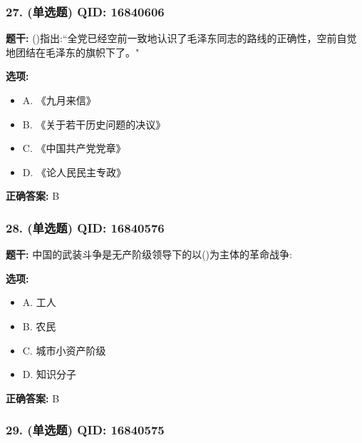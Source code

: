 \documentclass[12pt,UTF8]{ctexart}
\begin{document}
\subsubsection*{27. (单选题) \small QID: 16840606}

\textbf{题干:}
()指出:“全党已经空前一致地认识了毛泽东同志的路线的正确性，空前自觉地团结在毛泽东的旗帜下了。"

\textbf{选项:}
\begin{itemize}[leftmargin=*]

  \item A. 《九月来信》

  \item B. 《关于若干历史问题的决议》

  \item C. 《中国共产党党章》

  \item D. 《论人民民主专政》

\end{itemize}

\textbf{正确答案:}
B

\vspace{0.3em}\hrulefill\vspace{0.7em}

\subsubsection*{28. (单选题) \small QID: 16840576}

\textbf{题干:}
中国的武装斗争是无产阶级领导下的以()为主体的革命战争:

\textbf{选项:}
\begin{itemize}[leftmargin=*]

  \item A. 工人

  \item B. 农民

  \item C. 城市小资产阶级

  \item D. 知识分子

\end{itemize}

\textbf{正确答案:}
B

\vspace{0.3em}\hrulefill\vspace{0.7em}

\subsubsection*{29. (单选题) \small QID: 16840575}
\end{document}

